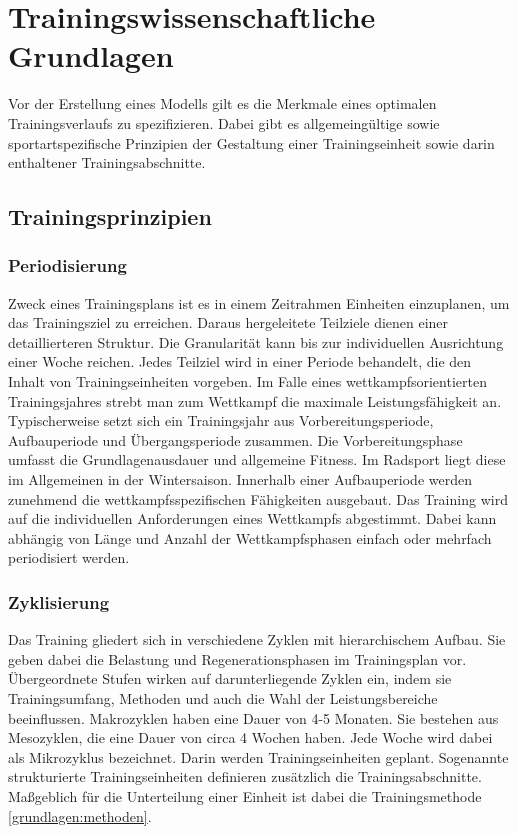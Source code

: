 \chapter{Trainingswissenschaftliche Grundlagen}
\label{sec:grundlagen:rad}
Vor der Erstellung eines Modells gilt es die Merkmale eines optimalen Trainingsverlaufs zu spezifizieren. Dabei gibt es allgemeingültige sowie sportartspezifische Prinzipien der Gestaltung einer Trainingseinheit sowie darin enthaltener Trainingsabschnitte.

\section{Trainingsprinzipien}
\subsection{Periodisierung}
    Zweck eines Trainingsplans ist es in einem Zeitrahmen Einheiten einzuplanen, um das Trainingsziel zu erreichen. Daraus hergeleitete Teilziele dienen einer detaillierteren Struktur. Die Granularität kann bis zur individuellen Ausrichtung einer Woche reichen. Jedes Teilziel wird in einer Periode behandelt, die den Inhalt von Trainingseinheiten vorgeben.\cite{periodization} \newline
    Im Falle eines wettkampfsorientierten Trainingsjahres strebt man zum Wettkampf die maximale Leistungsfähigkeit an. Typischerweise setzt sich ein Trainingsjahr aus Vorbereitungsperiode, Aufbauperiode und Übergangsperiode zusammen.\cite[279]{Trainingswissenschaft} Die Vorbereitungsphase umfasst die Grundlagenausdauer und allgemeine Fitness. Im Radsport liegt diese im Allgemeinen in der Wintersaison. Innerhalb einer Aufbauperiode werden zunehmend die wettkampfsspezifischen Fähigkeiten ausgebaut. Das Training wird auf die individuellen Anforderungen eines Wettkampfs abgestimmt. Dabei kann abhängig von Länge und Anzahl der Wettkampfsphasen einfach oder mehrfach periodisiert werden.
\subsection{Zyklisierung}
    Das Training gliedert sich in verschiedene Zyklen mit hierarchischem Aufbau. Sie geben dabei die Belastung und Regenerationsphasen im Trainingsplan vor. Übergeordnete Stufen wirken auf darunterliegende Zyklen ein, indem sie Trainingsumfang, Methoden und auch die Wahl der Leistungsbereiche beeinflussen. \cite[283]{Trainingswissenschaft}
    Makrozyklen haben eine Dauer von 4-5 Monaten. Sie bestehen aus Mesozyklen, die eine Dauer von circa 4 Wochen haben. Jede Woche wird dabei als Mikrozyklus bezeichnet. Darin werden Trainingseinheiten geplant. Sogenannte strukturierte Trainingseinheiten definieren zusätzlich die Trainingsabschnitte. Maßgeblich für die Unterteilung einer Einheit ist dabei die Trainingsmethode \ref{grundlagen:methoden}.
